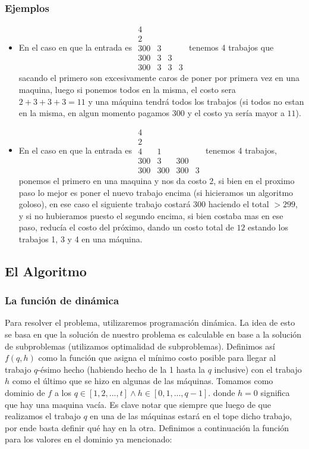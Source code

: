 \documentclass[A4paper,oneside,fleqn,11pt]{article}
\theoremstyle{definition}
\begin{document}
\subsubsection{Ejemplos}
\begin{itemize}
\item En el caso en que la entrada es $\begin{matrix}
  4 &  &  &  \\
  2 &  &  &  \\
  300 & 3 &  &  \\
  300 & 3 & 3 &  \\
  300 & 3 & 3 & 3 
\end{matrix}$ tenemos 4 trabajos que sacando el primero son excesivamente caros de poner por primera vez en una maquina, luego si ponemos todos en la misma, el costo sera $2+3+3+3=11$ y una máquina tendrá todos los trabajos (si todos no estan en la misma, en algun momento pagamos $300$ y el costo ya sería mayor a $11$).
\item En el caso en que la entrada es $\begin{matrix}
  4 &  &  &  \\
  2 &  &  &  \\
  4 & 1 &  &  \\
  300 & 3 & 300 &  \\
  300 & 300 & 300 & 3 
\end{matrix}$ tenemos 4 trabajos, ponemos el primero en una maquina y nos da costo $2$, si bien en el proximo paso lo mejor es poner el nuevo trabajo encima (si hicieramos un algoritmo goloso), en ese caso el siguiente trabajo costará $300$ haciendo el total $>299$, y si no hubieramos puesto el segundo encima, si bien costaba mas en ese paso, reducía el costo del próximo, dando un costo total de $12$ estando los trabajos 1, 3 y 4 en una máquina.
\end{itemize}


\subsection{El Algoritmo}

\subsubsection{La función de dinámica}
Para resolver el problema, utilizaremos programación dinámica. La idea de esto se basa en que la solución de nuestro problema es calculable en base a la solución de subproblemas (utilizamos optimalidad de subproblemas). Definimos así $f(q,h)$ como la función que asigna el mínimo costo posible para llegar al trabajo $q$-ésimo hecho (habiendo hecho de la 1 hasta la $q$ inclusive) con el trabajo $h$ como el último que se hizo en algunas de las máquinas. Tomamos como dominio de $f$ a los $q \in [1,2,...,t] \land h \in [0,1,...,q-1]$. donde $h=0$ significa que hay una maquina vacía. Es clave notar que siempre que luego de que realizamos el trabajo $q$ en una de las máquinas estará en el tope dicho trabajo, por ende basta definir qué hay en la otra. Definimos a continuación la función para los valores en el dominio ya mencionado:
\end{document}
